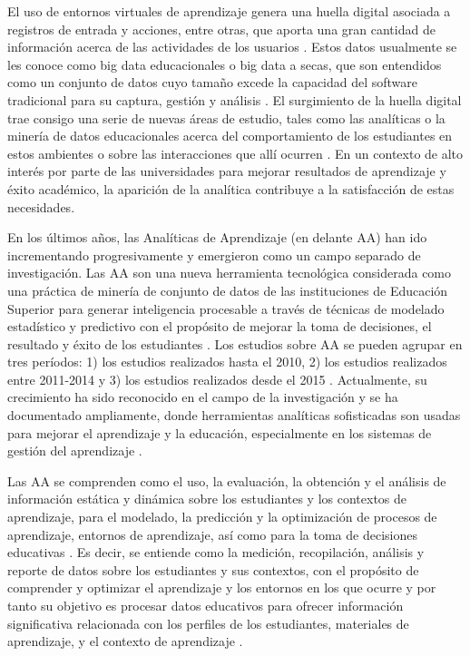\documentclass[spanish]{textolivre}
\begin{document}
El uso de entornos virtuales de aprendizaje genera una huella digital asociada a registros de entrada y acciones, entre otras, que aporta una gran cantidad de información acerca de las actividades de los usuarios \cite{kerimbayev2020}. Estos datos usualmente se les conoce como big data educacionales o big data a secas, que son entendidos como un conjunto de datos cuyo tamaño excede la capacidad del software tradicional para su captura, gestión y análisis \cite{picciano2012, tulasi2013}. El surgimiento de la huella digital trae consigo una serie de nuevas áreas de estudio, tales como las analíticas o la minería de datos educacionales acerca del comportamiento de los estudiantes en estos ambientes o sobre las interacciones que allí ocurren \cite{klasnja-milicevic2017}. En un contexto de alto interés por parte de las universidades para mejorar resultados de aprendizaje y éxito académico, la aparición de la analítica contribuye a la satisfacción de estas necesidades.

En los últimos años, las Analíticas de Aprendizaje (en delante AA) han ido incrementando progresivamente y emergieron como un campo separado de investigación. Las AA son una nueva herramienta tecnológica considerada como una práctica de minería de conjunto de datos de las instituciones de Educación Superior para generar inteligencia procesable a través de técnicas de modelado estadístico y predictivo con el propósito de mejorar la toma de decisiones, el resultado y éxito de los estudiantes \cite{hooda2020}. Los estudios sobre AA se pueden agrupar en tres períodos: 1) los estudios realizados hasta el 2010, 2) los estudios realizados entre 2011-2014 y 3) los estudios realizados desde el 2015 \cite{sahin2019}. Actualmente, su crecimiento ha sido reconocido en el campo de la investigación y se ha documentado ampliamente, donde herramientas analíticas sofisticadas son usadas para mejorar el aprendizaje y la educación, especialmente en los sistemas de gestión del aprendizaje \cite{cechinel2020}.

Las AA se comprenden como el uso, la evaluación, la obtención y el análisis de información estática y dinámica sobre los estudiantes y los contextos de aprendizaje, para el modelado, la predicción y la optimización de procesos de aprendizaje, entornos de aprendizaje, así como para la toma de decisiones educativas \cite{hooda2020}. Es decir, se entiende como la medición, recopilación, análisis y reporte de datos sobre los estudiantes y sus contextos, con el propósito de comprender y optimizar el aprendizaje y los entornos en los que ocurre y por tanto su objetivo es procesar datos educativos para ofrecer información significativa relacionada con los perfiles de los estudiantes, materiales de aprendizaje, y el contexto de aprendizaje \cite{nguyen2021}.
\end{document}

